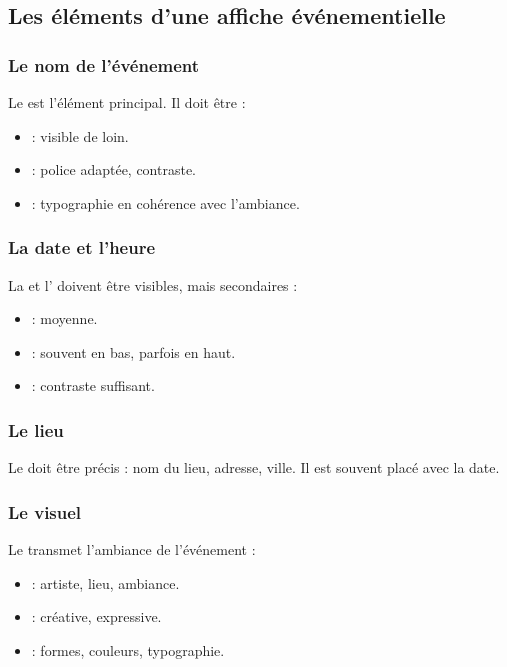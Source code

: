 \subsection{Les éléments d'une affiche événementielle}

\subsubsection{Le nom de l'événement}

Le  est l'élément principal. Il doit être :

\begin{itemize}
    \item {} : visible de loin.
    \item {} : police adaptée, contraste.
    \item {} : typographie en cohérence avec l'ambiance.
\end{itemize}

\subsubsection{La date et l'heure}

La  et l' doivent être visibles, mais secondaires :

\begin{itemize}
    \item {} : moyenne.
    \item {} : souvent en bas, parfois en haut.
    \item {} : contraste suffisant.
\end{itemize}

\subsubsection{Le lieu}

Le  doit être précis : nom du lieu, adresse, ville. Il est souvent placé avec la date.

\subsubsection{Le visuel}

Le  transmet l'ambiance de l'événement :

\begin{itemize}
    \item {} : artiste, lieu, ambiance.
    \item {} : créative, expressive.
    \item {} : formes, couleurs, typographie.
\end{itemize}

